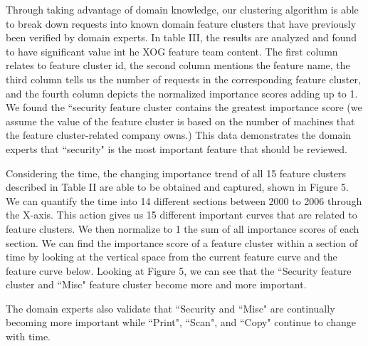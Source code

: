 \documentclass[sigconf]{acmart}
\begin{document}
Through taking advantage of domain knowledge, our clustering algorithm is able to break down requests into known domain feature clusters that have previously been verified by domain experts. In table III, the results are analyzed and found to have significant value int he XOG feature team content. The first column relates to feature cluster id, the second column mentions the feature name, the third column tells us the number of requests in the corresponding feature cluster, and the fourth column depicts the normalized importance scores adding up to 1. We found the ``security feature cluster contains the greatest importance score (we assume the value of the feature cluster is based on the number of machines that the feature cluster-related company owns.) This data demonstrates the domain experts that ``security" is the most important feature that should be reviewed.

Considering the time, the changing importance trend of all 15 feature clusters described in Table II are able to be obtained and captured, shown in Figure 5. We can quantify the time into 14 different sections between 2000 to 2006 through the X-axis.  This action gives us 15 different important curves that are related to feature clusters. We then normalize to 1 the sum of all importance scores of each section. We can find the importance score of a feature cluster within a section of time by looking at the vertical space from the current feature curve and the feature curve below. Looking at Figure 5, we can see that the ``Security feature cluster and ``Misc" feature cluster become more and more important.

The domain experts also validate that ``Security and ``Misc" are continually becoming more important while ``Print", ``Scan", and ``Copy" continue to change with time.
\end{document}
